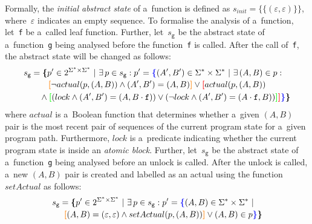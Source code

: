 Formally, the \emph{initial abstract state} of a~function is defined as $ s_{init} = \{\{(\varepsilon, \varepsilon)\}\} $, where~$\varepsilon $ indicates an empty sequence. To formalise the analysis of a~function, let~\texttt{f} be a~called leaf function. Further, let~$ s_\mathtt{g} $ be the abstract state of a~function~\texttt{g} being analysed before the function~\texttt{f} is called. After the call of~\texttt{f}, the abstract state will be changed as follows:
$$
\begin{multlined}
    s_\mathtt{g} = \bb{\{}p^\prime \in 2^{\Sigma^* \times \Sigma^*}\ |\ \exists\,p \in s_\mathtt{g} : p^\prime = \bA{\{} (A^\prime, B^\prime) \in \Sigma^* \times \Sigma^*\ |\ \exists\,(A, B) \in p : \\
%
    \bB{[}\neg actual(p, (A, B)) \wedge (A^\prime, B^\prime) = (A, B)\bB{]} \vee \bC{[}actual(p, {(A, B)}) \\
%
    \wedge \bD{[}(lock \wedge (A^\prime, B^\prime) = (A, B \cdot \mathtt{f})) \vee (\neg lock \wedge (A^\prime, B^\prime) = (A \cdot \mathtt{f}, B))%
%
    \bD{]}\bC{]}\bA{\}}\bb{\}}
\end{multlined}
$$
where $ actual $ is a~Boolean function that determines whether a~given $ (A, B) $ pair is the most recent pair of sequences of the current program state for a~given program path. Furthermore, $ lock $ is a~predicate indicating whether the current program state is inside an \emph{atomic block}. Further, let~$ s_\mathtt{g} $ be the abstract state of a~function~\texttt{g} being analysed before an unlock is called. After the unlock is called, a~new $ (A, B) $ pair is created and labelled as an actual using the function $ setActual $ as follows: 
$$
\begin{multlined}
    s_\mathtt{g} = \bb{\{}p^\prime \in 2^{\Sigma^* \times \Sigma^*}\ |\ \exists\,p \in s_\mathtt{g} : p^\prime = \bA{\{}(A, B) \in \Sigma^* \times \Sigma^*\ | \\
%
    \bB{[}(A, B) = (\varepsilon, \varepsilon) \wedge setActual(p, (A, B))\bB{]} \vee (A, B) \in p%
%
    \bA{\}}\bb{\}}
\end{multlined}
$$

